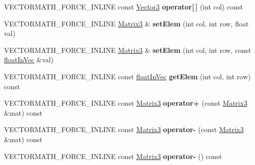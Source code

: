 \begin{DoxyCompactItemize}
V\+E\+C\+T\+O\+R\+M\+A\+T\+H\+\_\+\+F\+O\+R\+C\+E\+\_\+\+I\+N\+L\+I\+NE const \hyperlink{classVectormath_1_1Aos_1_1Vector3}{Vector3} {\bfseries operator\mbox{[}$\,$\mbox{]}} (int col) const
\item 
\mbox{\label{classVectormath_1_1Aos_1_1Matrix3_a89e00faa17e4db55404b11de366862d6}} 
V\+E\+C\+T\+O\+R\+M\+A\+T\+H\+\_\+\+F\+O\+R\+C\+E\+\_\+\+I\+N\+L\+I\+NE \hyperlink{classVectormath_1_1Aos_1_1Matrix3}{Matrix3} \& {\bfseries set\+Elem} (int col, int row, float val)
\item 
\mbox{\label{classVectormath_1_1Aos_1_1Matrix3_a0cbba5af7af868109d3c65cc26f76447}} 
V\+E\+C\+T\+O\+R\+M\+A\+T\+H\+\_\+\+F\+O\+R\+C\+E\+\_\+\+I\+N\+L\+I\+NE \hyperlink{classVectormath_1_1Aos_1_1Matrix3}{Matrix3} \& {\bfseries set\+Elem} (int col, int row, const \hyperlink{classVectormath_1_1floatInVec}{float\+In\+Vec} \&val)
\item 
\mbox{\label{classVectormath_1_1Aos_1_1Matrix3_aef72a6899878fe187382f28a9aa260ff}} 
V\+E\+C\+T\+O\+R\+M\+A\+T\+H\+\_\+\+F\+O\+R\+C\+E\+\_\+\+I\+N\+L\+I\+NE const \hyperlink{classVectormath_1_1floatInVec}{float\+In\+Vec} {\bfseries get\+Elem} (int col, int row) const
\item 
\mbox{\label{classVectormath_1_1Aos_1_1Matrix3_a3bdfadc5563b117e1bfd5603e9ad3f86}} 
V\+E\+C\+T\+O\+R\+M\+A\+T\+H\+\_\+\+F\+O\+R\+C\+E\+\_\+\+I\+N\+L\+I\+NE const \hyperlink{classVectormath_1_1Aos_1_1Matrix3}{Matrix3} {\bfseries operator+} (const \hyperlink{classVectormath_1_1Aos_1_1Matrix3}{Matrix3} \&mat) const
\item 
\mbox{\label{classVectormath_1_1Aos_1_1Matrix3_ac1dd0ae158da37a832ee30c01ccc8b37}} 
V\+E\+C\+T\+O\+R\+M\+A\+T\+H\+\_\+\+F\+O\+R\+C\+E\+\_\+\+I\+N\+L\+I\+NE const \hyperlink{classVectormath_1_1Aos_1_1Matrix3}{Matrix3} {\bfseries operator-\/} (const \hyperlink{classVectormath_1_1Aos_1_1Matrix3}{Matrix3} \&mat) const
\item 
\mbox{\label{classVectormath_1_1Aos_1_1Matrix3_a4e3095347e8a34de1136fe847e6a4783}} 
V\+E\+C\+T\+O\+R\+M\+A\+T\+H\+\_\+\+F\+O\+R\+C\+E\+\_\+\+I\+N\+L\+I\+NE const \hyperlink{classVectormath_1_1Aos_1_1Matrix3}{Matrix3} {\bfseries operator-\/} () const

\end{DoxyCompactItemize}
